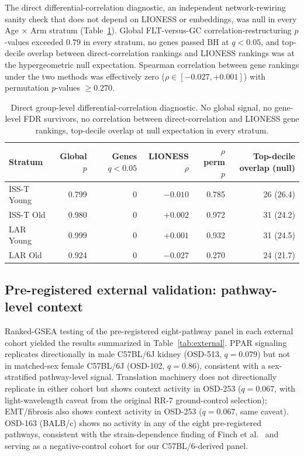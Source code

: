 \documentclass[11pt]{article}
\begin{document}
The direct differential-correlation diagnostic, an independent network-rewiring sanity check that does not depend on LIONESS or embeddings, was null in every Age $\times$ Arm stratum (Table~\ref{tab:direct_corr}). Global FLT-versus-GC correlation-restructuring $p$-values exceeded $0.79$ in every stratum, no genes passed BH at $q < 0.05$, and top-decile overlap between direct-correlation rankings and LIONESS rankings was at the hypergeometric null expectation. Spearman correlation between gene rankings under the two methods was effectively zero ($\rho \in [-0.027, +0.001]$) with permutation $p$-values $\geq 0.270$.

\begin{table}[h]
\centering\small
\begin{tabular}{lrrrrr}
\toprule
Stratum & Global $p$ & Genes $q<0.05$ & LIONESS $\rho$ & $\rho$ perm $p$ & Top-decile overlap (null) \\
\midrule
ISS-T Young & 0.799 & 0 & $-0.010$ & 0.785 & 26 (26.4) \\
ISS-T Old & 0.980 & 0 & $+0.002$ & 0.972 & 31 (24.2) \\
LAR Young & 0.999 & 0 & $+0.001$ & 0.932 & 31 (24.5) \\
LAR Old & 0.924 & 0 & $-0.027$ & 0.270 & 24 (21.7) \\
\bottomrule
\end{tabular}
\caption{Direct group-level differential-correlation diagnostic. No global signal, no gene-level FDR survivors, no correlation between direct-correlation and LIONESS gene rankings, top-decile overlap at null expectation in every stratum.}
\label{tab:direct_corr}
\end{table}

\subsection{Pre-registered external validation: pathway-level context}

Ranked-GSEA testing of the pre-registered eight-pathway panel in each external cohort yielded the results summarized in Table~\ref{tab:external}. PPAR signaling replicates directionally in male C57BL/6J kidney (OSD-513, $q = 0.079$) but not in matched-sex female C57BL/6J (OSD-102, $q = 0.86$), consistent with a sex-stratified pathway-level signal. Translation machinery does not directionally replicate in either cohort but shows context activity in OSD-253 ($q = 0.067$, with light-wavelength caveat from the original RR-7 ground-control selection); EMT/fibrosis also shows context activity in OSD-253 ($q = 0.067$, same caveat). OSD-163 (BALB/c) shows no activity in any of the eight pre-registered pathways, consistent with the strain-dependence finding of Finch et al.\ \citep{finch2025strain} and serving as a negative-control cohort for our C57BL/6-derived panel.
\end{document}
